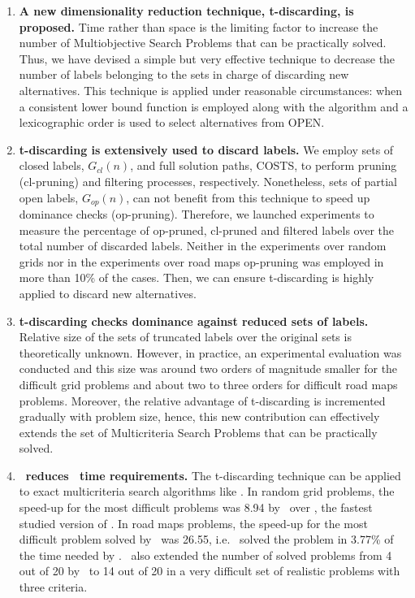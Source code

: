 \begin{enumerate}
    \item \textbf{A new dimensionality reduction technique, t-discarding, is proposed.} Time rather than space is the limiting factor to increase the number of Multiobjective Search Problems that can be practically solved. Thus, we have devised a simple but very effective technique to decrease the number of labels belonging to the sets in charge of discarding new alternatives. This technique is applied under reasonable circumstances: when a consistent lower bound function is employed along with the algorithm and a lexicographic order is used to select alternatives from OPEN. 
    
    \item \textbf{t-discarding is extensively used to discard labels.} We employ sets of closed labels, $G_{cl}(n)$, and full solution paths, COSTS, to perform pruning (cl-pruning) and filtering processes, respectively. Nonetheless, sets of partial open labels, $G_{op}(n)$,  can not benefit from this technique to speed up dominance checks (op-pruning). Therefore, we launched experiments to measure the percentage of op-pruned, cl-pruned and filtered labels over the total number of discarded labels. Neither in the experiments over random grids nor in the experiments over road maps op-pruning was employed in more than 10\% of the cases. Then, we can ensure t-discarding is highly applied to discard new alternatives.
    
    \item \textbf{t-discarding checks dominance against reduced sets of labels.} Relative size of the sets of truncated labels over the original sets is theoretically unknown. However, in practice, an experimental evaluation was conducted and this size was around two orders of magnitude smaller for the difficult grid problems and about two to three orders for difficult road maps problems. Moreover, the relative advantage of t-discarding is incremented gradually with problem size, hence, this new contribution can effectively extends the set of Multicriteria Search Problems that can be practically solved.   
    
    \item \textbf{\namoate \ reduces \namoa \ time requirements.} The t-discarding technique can be applied to exact multicriteria search algorithms like \namoa. In random grid problems, the speed-up for the most difficult problems was 8.94 by \namoate \ over \namoalin, the fastest studied version of \namoa. In road maps problems, the speed-up for the most difficult problem solved by \namoalin \ was 26.55, i.e. \namoate \ solved the problem in 3.77\% of the time needed by \namoalin. \namoate \ also extended the number of solved problems from 4 out of 20 by \namoalin \ to 14 out of 20 in a very difficult set of realistic problems with three criteria.
    

\end{enumerate}
